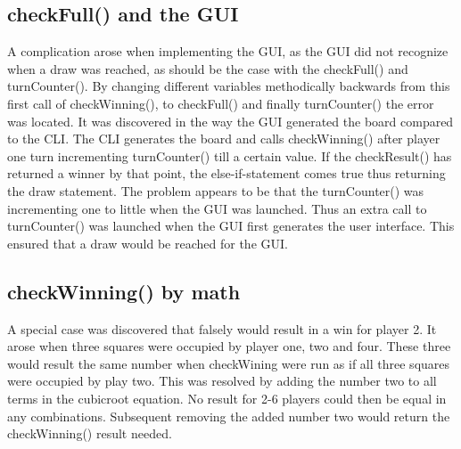 \documentclass[a4paper,10pt]{article}
\begin{document}
	\subsection{checkFull() and the GUI}
	A complication arose when implementing the GUI, as the GUI did not recognize when a draw was reached, as should be the case with the checkFull() and turnCounter(). By changing different variables methodically backwards from this first call of checkWinning(), to checkFull() and finally turnCounter() the error was located. It was discovered in the way the GUI generated the board compared to the CLI.  The CLI generates the board and calls checkWinning() after player one turn incrementing turnCounter() till a certain value. If the checkResult() has returned a winner by that point, the else-if-statement comes true thus returning the draw statement.  
	The problem appears to be that the turnCounter() was incrementing one to little when the GUI was launched. Thus an extra call to turnCounter() was launched when the GUI first generates the user interface. This ensured that a draw would be reached for the GUI.
	
	\subsection{checkWinning() by math}
	A special case was discovered that falsely would result in a win for player 2. It arose when three squares were occupied by player one, two and four. These three would result the same number when checkWining were run as if all three squares were occupied by play two.
	This was resolved by adding the number two to all terms in the cubicroot equation. No result for 2-6 players could then be equal in any combinations. Subsequent removing the added number two would return the checkWinning() result needed.
	
	
	\begin{comment}
	I testing skal i forklare jeres tests osv. udover det kan i have et billede med
	som i kan tilføje ved at kopiere includegraphics som herunder.
	
	\begin{figure}[H]\center
	\texttt{[image: billede.png]}
	\caption{}
	\end{figure}
	
	udskift billede.png med jeres billede fil som skal ligge i samme mappe som .tex
	i kan ændre på scale for at �?¦ndre p�?¥ billede størrelse i pdfen.
	\end{comment}
	
\end{document}

